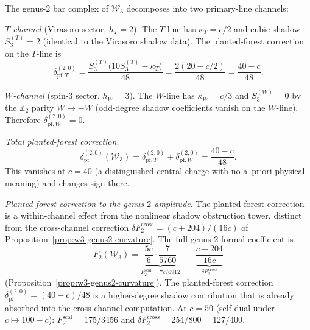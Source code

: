 \begin{computation}
\label{comp:w3-cross-channel-genus2}
The genus-$2$ bar complex of $\mathcal{W}_3$ decomposes into two
primary-line channels\textup{:}

\medskip\noindent
\emph{$T$-channel} (Virasoro sector, $h_T = 2$).
The $T$-line has $\kappa_T = c/2$ and cubic shadow
$S_3^{(T)} = 2$ (identical to the Virasoro shadow data). The
planted-forest correction on the $T$-line is
\begin{equation}\label{eq:w3-T-pf-genus2}
\delta_{\mathrm{pf},T}^{(2,0)} =
\frac{S_3^{(T)}\bigl(10 S_3^{(T)} - \kappa_T\bigr)}{48}
= \frac{2(20 - c/2)}{48}
= \frac{40 - c}{48}.
\end{equation}

\medskip\noindent
\emph{$W$-channel} (spin-$3$ sector, $h_W = 3$).
The $W$-line has $\kappa_W = c/3$ and $S_3^{(W)} = 0$ by the
$\mathbb{Z}_2$ parity $W \mapsto -W$ (odd-degree shadow
coefficients vanish on the $W$-line). Therefore
$\delta_{\mathrm{pf},W}^{(2,0)} = 0$.

\medskip\noindent
\emph{Total planted-forest correction}.
\begin{equation}\label{eq:w3-pf-genus2-total}
\delta_{\mathrm{pf}}^{(2,0)}(\mathcal{W}_3)
= \delta_{\mathrm{pf},T}^{(2,0)} + \delta_{\mathrm{pf},W}^{(2,0)}
= \frac{40 - c}{48}.
\end{equation}
This vanishes at $c = 40$ (a distinguished central charge with
no a~priori physical meaning) and changes sign there.

\medskip\noindent
\emph{Planted-forest correction to the genus-$2$ amplitude}.
The planted-forest correction is a within-channel effect from
the nonlinear shadow obstruction tower, distinct from the
cross-channel correction
$\delta F_2^{\mathrm{cross}} = (c{+}204)/(16c)$ of
Proposition~\ref{prop:w3-genus2-curvature}. The full genus-$2$
formal coefficient is
\begin{equation}\label{eq:w3-F2-cross-channel}
F_2(\mathcal{W}_3)
= \underbrace{\frac{5c}{6} \cdot \frac{7}{5760}}_{\displaystyle
F_2^{\mathrm{scal}} = 7c/6912}
\;+\;
\underbrace{\frac{c + 204}{16c}}_{\displaystyle
\delta F_2^{\mathrm{cross}}}
\end{equation}
(Proposition~\ref{prop:w3-genus2-curvature}).
The planted-forest correction
$\delta_{\mathrm{pf}}^{(2,0)} = (40{-}c)/48$ is a
higher-degree shadow contribution
that is already absorbed into the cross-channel computation.
At $c = 50$ (self-dual under $c \mapsto 100 - c$)\textup{:}
$F_2^{\mathrm{scal}} = 175/3456$ and
$\delta F_2^{\mathrm{cross}} = 254/800 = 127/400$.
\end{computation}

